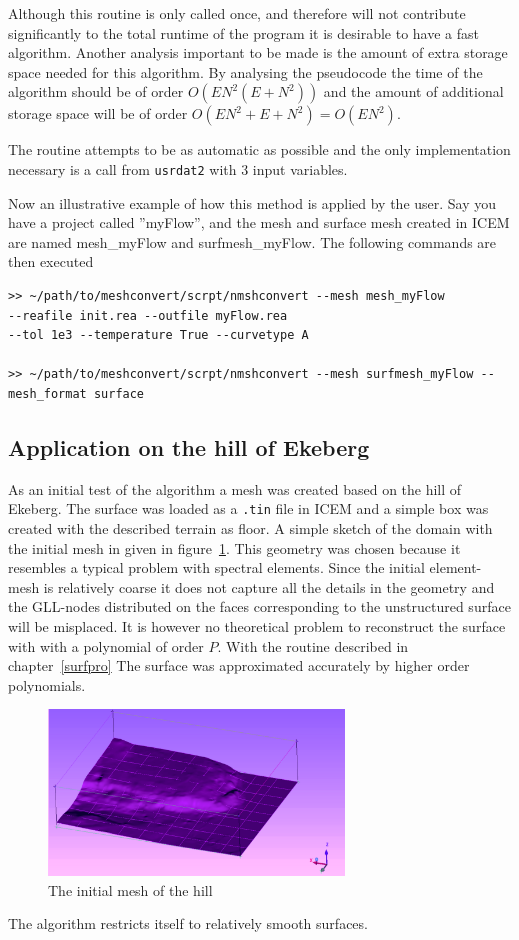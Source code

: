 Although this routine is only called once, and therefore will not contribute significantly 
to the total runtime of the program it is desirable to have a fast algorithm. Another analysis
important to be made is the amount of extra storage space needed for this algorithm.
By analysing the pseudocode the time of the algorithm should be of order $O(EN^2(E+N^2))$
and the amount of additional storage space will be of order $O(EN^2+E+N^2)=O(EN^2)$.

The routine attempts to be as automatic as possible and the only implementation necessary is 
a call from \verb|usrdat2| with 3 input variables.

Now an illustrative example of how this method is applied by the user. Say you have a project
called ''myFlow'', and the mesh and surface mesh created in ICEM are named mesh\_myFlow and 
surfmesh\_myFlow. The following commands are then executed

%
\begin{lstlisting}[frame=single]
>> ~/path/to/meshconvert/scrpt/nmshconvert --mesh mesh_myFlow 
--reafile init.rea --outfile myFlow.rea
--tol 1e3 --temperature True --curvetype A

>> ~/path/to/meshconvert/scrpt/nmshconvert --mesh surfmesh_myFlow --mesh_format surface
\end{lstlisting}
% 
\subsection{Application on the hill of Ekeberg}
As an initial test of the algorithm a mesh was created based on the hill of Ekeberg.
The surface was loaded as a \verb|.tin| file in ICEM and a simple box was created with 
the described terrain as floor. A simple sketch of the domain with the initial mesh in given in 
figure~\ref{fig:ekeberg}. This geometry was chosen because it resembles a typical problem with 
spectral elements. Since the initial element-mesh is relatively coarse it does not capture all 
the details in the geometry and the GLL-nodes distributed on the faces corresponding to the 
unstructured surface will be misplaced. It is however no theoretical problem to reconstruct the 
surface with with a polynomial of order $P$. With the routine described in chapter~\ref{surfpro}
The surface was approximated accurately by higher order polynomials.
%
\begin{figure}[t]
    \centering
	\includegraphics[width=0.7\textwidth]{Figures/mesh_ekebergaasen2.png}
    \caption{The initial mesh of the hill}
	\label{fig:ekeberg}
\end{figure}
%
The algorithm restricts itself to relatively smooth surfaces.
